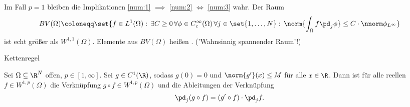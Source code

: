 \begin{bemerkung}
  Im Fall $p = 1$ bleiben die Implikationen \ref{num:1} $\implies$ \ref{num:2} $\iff$ \ref{num:3} wahr. Der Raum
  \begin{align*}
 BV(\Omega)\coloneqq \set{f \in L^{1}(\Omega): \, \exists C\geq 0\, \forall \phi \in C_{c}^{\infty}(\Omega) \, \forall j \in \set{1, \dots, N}: \, \norm{\int_{\Omega} f \pd_{j}\phi} \leq C \cdot \nnorm \phi _{L^{\infty}}}
  \end{align*}
ist echt größer als $W^{1, 1}(\Omega)$. Elemente aus $BV(\Omega)$ heißen . ('Wahnsinnig spannender Raum'!)
\end{bemerkung}
\begin{theorem} Kettenregel 

Sei $\Omega\subseteq \R^{N}$ offen, $p \in [1, \infty]$. Sei $g \in C^{1}(\R)$, sodass $g(0) = 0$ und $\norm{g'}(x)\leq M$ für alle $x \in \R$. Dann ist für alle reellen $f \in W^{1, p}(\Omega)$ die Verknüpfung $ g\circ f \in W^{1, p}(\Omega)$ und die Ableitungen der Verknüpfung
\begin{align*}
  \pd_{j}(g \circ f) = (g' \circ f) \cdot \pd_{j} f. 
\end{align*}
\end{theorem}

